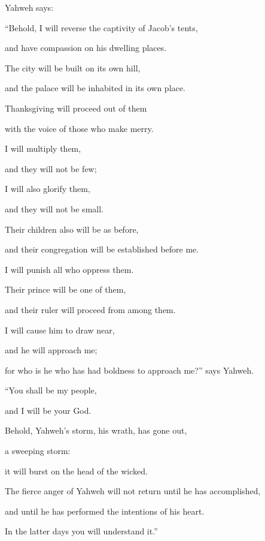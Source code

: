 {\par }{\PP {}Yahweh says:
\par }{\Q “Behold, I will reverse the captivity of Jacob’s tents,
\par }{\QB and have compassion on his dwelling places.
\par }{\Q The city will be built on its own hill,
\par }{\QB and the palace will be inhabited in its own place.
\par }{\Q {}Thanksgiving will proceed out of them
\par }{\QB with the voice of those who make merry.
\par }{\Q I will multiply them,
\par }{\QB and they will not be few;
\par }{\Q I will also glorify them,
\par }{\QB and they will not be small.
\par }{\Q {}Their children also will be as before,
\par }{\QB and their congregation will be established before me.
\par }{\QB I will punish all who oppress them.
\par }{\Q {}Their prince will be one of them,
\par }{\QB and their ruler will proceed from among them.
\par }{\Q I will cause him to draw near,
\par }{\QB and he will approach me;
\par }{\QB for who is he who has had boldness to approach me?” says Yahweh.
\par }{\Q {}“You shall be my people,
\par }{\QB and I will be your God.
\par }{\Q {}Behold, Yahweh’s storm, his wrath, has gone out,
\par }{\QB a sweeping storm:
\par }{\QB it will burst on the head of the wicked.
\par }{\Q {}The fierce anger of Yahweh will not return until he has accomplished,
\par }{\QB and until he has performed the intentions of his heart.
\par }{\QB In the latter days you will understand it.”

}
